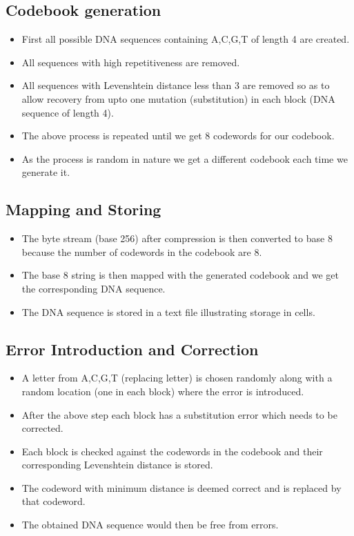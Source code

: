 \documentclass[11pt]{article}
\begin{document}
\subsection{Codebook generation}

\begin{itemize}
    \item First all possible DNA sequences containing A,C,G,T of length 4 are created.
    \item All sequences with high repetitiveness are removed.
    \item All sequences with Levenshtein distance less than 3 are removed so as to allow recovery from upto one mutation (substitution) in each block (DNA sequence of length 4).
    \item The above process is repeated until we get 8 codewords for our codebook.
    \item As the process is random in nature we get a different codebook each time we generate it.
\end{itemize}

\subsection{Mapping and Storing}

\begin{itemize}
    \item The byte stream (base 256) after compression is then converted to base 8 because the number of codewords in the codebook are 8.
    \item The base 8 string is then mapped with the generated codebook and we get the corresponding DNA sequence.
    \item The DNA sequence is stored in a text file illustrating storage in cells. 
\end{itemize}

\subsection{Error Introduction and Correction}

\begin{itemize}
    \item A letter from A,C,G,T (replacing letter) is chosen randomly along with a random location (one in each block) where the error is introduced.
    \item After the above step each block has a substitution error which needs to be corrected.
    \item Each block is checked against the codewords in the codebook and their corresponding Levenshtein distance is stored.
    \item The codeword with minimum distance is deemed correct and is replaced by that codeword.
    \item The obtained DNA sequence would then be free from errors. 
\end{itemize}
\end{document}
